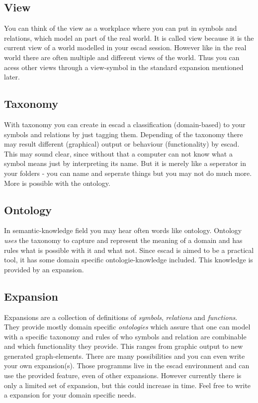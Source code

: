 \documentclass[a4paper, 12pt, openany]{scrbook}
\begin{document}
\subsection{View}
You can think of the view as a workplace where you can put in symbols and relations, which model an part of the real world. It is called view because it is the current view of a world modelled in your escad session. However like in the real world there are often multiple and different views of the world. Thus you can acess other views through a view-symbol in the standard expansion mentioned later.
\subsection{Taxonomy}
With taxonomy you can create in escad a classification (domain-based) to your symbols and relations by just tagging them. Depending of the taxonomy there may result different (graphical) output or behaviour (functionality) by escad. This may sound clear, since without that a computer can not know what a symbol means just by interpreting its name. But it is merely like a seperator in your folders - you can name and seperate things but you may not do much more. More is possible with the ontology.
\subsection{Ontology}
In semantic-knowledge field you may hear often words like ontology. Ontology \emph{uses} the taxonomy to capture and represent the meaning of a domain and has rules what is possible with it and what not. Since escad is aimed to be a practical tool, it has some domain specific ontologie-knowledge included. This knowledge is provided by an expansion.
\subsection{Expansion}
Expansions are a collection of definitions of \emph{symbols}, \emph{relations} and \emph{functions}. They provide mostly domain specific \emph{ontologies} which assure that one can model with a specific taxonomy and rules of who symbols and relation are combinable and which functionality they provide. This ranges from graphic output to new generated graph-elements. There are many possibilities and you can even write your own expansion(s). Those programms live in the escad environment and can use the provided feature, even of other expansions. However currently there is only a limited set of expansion, but this could increase in time. Feel free to write a expansion for your domain specific needs.
\end{document}
